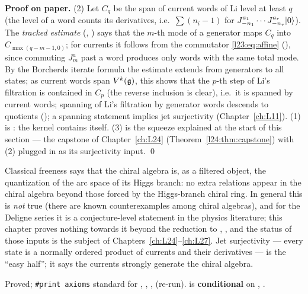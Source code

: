 \textbf{Proof on paper.} (2) Let $C_q$ be the span of current words of Li level at least $q$ (the level of a word counts its
derivatives, i.e.\ $\sum(n_i-1)$ for $J^{a_1}_{-n_1}\cdots J^{a_r}_{-n_r}|0\rangle$). The \emph{tracked estimate}
(, ) says that the $m$-th mode of a
generator maps $C_q$ into $C_{\max(q-m-1,0)}$; for currents it follows from the commutator \eqref{l23:eq:affine}
(), since commuting $J^a_m$ past a word produces only words with the same total mode. By the
Borcherds iterate formula the estimate extends from generators to all states; as current words span $V^k(\mathfrak g)$, this shows that the
$p$-th step of Li's filtration is contained in $C_p$ (the reverse inclusion is clear), i.e.\ it is spanned by current words; spanning of Li's filtration by generator words descends to quotients (); a spanning
statement implies jet surjectivity (Chapter~\ref{ch:L11}). (1) is : the kernel contains itself. (3) is the squeeze
explained at the start of this section --- the capstone of Chapter~\ref{ch:L24} (Theorem~\ref{l24:thm:capstone}) with (2) plugged in as its
surjectivity input. \qed

\begin{physics}
Classical freeness says that the chiral algebra is, as a filtered object, the quantization of the arc space of its Higgs branch: no extra
relations appear in the chiral algebra beyond those forced by the Higgs-branch chiral ring. In general this is \emph{not} true (there are
known counterexamples among chiral algebras), and for the Deligne series it is a conjecture-level statement in the physics literature;
this chapter proves nothing towards it beyond the reduction to , , and the status of those inputs is the subject of
Chapters~\ref{ch:L24}--\ref{ch:L27}. Jet surjectivity --- every state is a normally
ordered product of currents and their derivatives --- is the ``easy half''; it says the currents strongly generate the chiral algebra.
\end{physics}

\begin{status}
Proved; \texttt{\#print axioms} standard for , ,
,  (re-run).
 is \textbf{conditional} on , .
\end{status}

